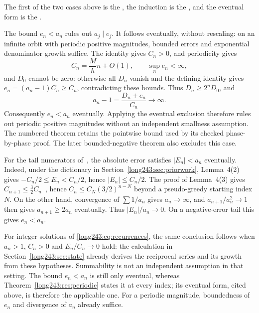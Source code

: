 \documentclass[11pt]{article}
\begin{document}
\noindent The first of the two cases above is the
, the induction is the
, and the eventual form is the
.

The bound $e_n<a_n$ rules out $a_j\mid e_j$. It follows eventually,
without rescaling: on an infinite orbit with periodic positive
magnitudes, bounded errors and exponential denominator growth suffice.
The identity gives $C_n>0$, and periodicity gives
\[
 C_n=\frac{M}{h}n+O(1),\qquad \sup_ne_n<\infty,
\]
and $D_0$ cannot be zero: otherwise all $D_n$ vanish and the defining identity gives $e_n=(a_n-1)C_n\ge C_n$, contradicting these bounds.
Thus $D_n\ge2^nD_0$, and
\[
 a_n-1=\frac{D_n+e_n}{C_n}\longrightarrow\infty.
\]
Consequently $e_n<a_n$ eventually. Applying the eventual exclusion
therefore rules out periodic positive magnitudes without an independent
smallness assumption. The numbered theorem retains the pointwise bound
used by its checked phase-by-phase proof. The later bounded-negative
theorem also excludes this case.

\begin{remark}\label{long243:rem:eventual-error-bound}
For the tail numerators of~\cite{koizumi2025}, the absolute error
satisfies $|E_n|<a_n$ eventually. Indeed, under the dictionary in
Section~\ref{long243:sec:priorwork}, Lemma~4(2) gives
$-C_n/2\le E_n<C_n/2$, hence $|E_n|\le C_n/2$. The proof of Lemma~4(3) gives
$C_{n+1}\le\tfrac32C_n$~\cite[pp.~11--12]{koizumi2025}, hence
$C_n\le C_N(3/2)^{n-N}$ beyond a pseudo-greedy starting index $N$.
On the other hand, convergence of $\sum1/a_n$ gives $a_n\to\infty$,
and $a_{n+1}/a_n^2\to1$ then gives $a_{n+1}\ge2a_n$ eventually.
Thus $|E_n|/a_n\to0$. On a negative-error tail this gives $e_n<a_n$.

For integer solutions of \eqref{long243:eq:recurrences}, the same conclusion follows when
$a_n>1$, $C_n>0$ and $E_n/C_n\to0$ hold: the calculation in
Section~\ref{long243:sec:state} already derives the reciprocal series and
its growth from these hypotheses. Summability is not an independent
assumption in that setting. The bound $e_n<a_n$ is still only eventual,
whereas Theorem~\ref{long243:res:periodic} states it at every index;
its eventual form, cited above, is therefore the applicable one.
For a periodic magnitude, boundedness of $e_n$ and divergence of $a_n$
already suffice.
\end{remark}
\end{document}
